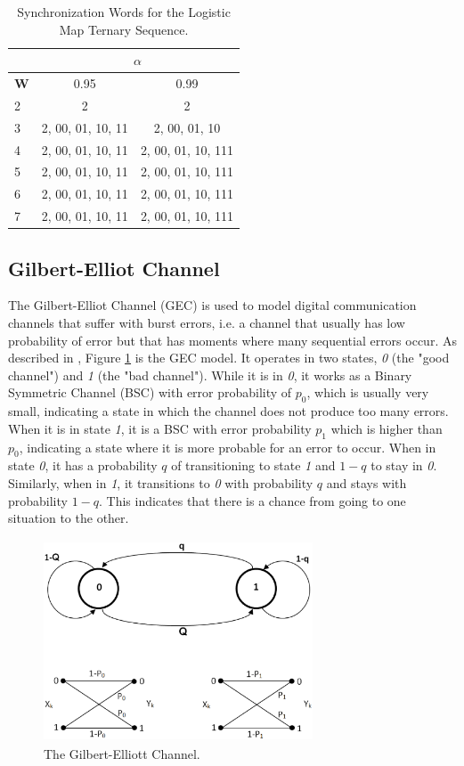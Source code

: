 {\begin{table}
\centering
\begin{tabular}{|l|c|c|}
\hline
 & \multicolumn{2}{c|}{\textbf{$\alpha$}}\\
 \hline
\textbf{W} & 0.95 & 0.99 \\
\hline
2 & 2 & 2 \\ 
3 & 2, 00, 01, 10, 11 & 2, 00, 01, 10 \\ 
4 & 2, 00, 01, 10, 11 & 2, 00, 01, 10, 111 \\ 
5 & 2, 00, 01, 10, 11 & 2, 00, 01, 10, 111 \\
6 & 2, 00, 01, 10, 11 & 2, 00, 01, 10, 111 \\ 
7 & 2, 00, 01, 10, 11 & 2, 00, 01, 10, 111 \\ 
 \hline
\end{tabular}
\caption{Synchronization Words for the Logistic Map Ternary Sequence. \label{tab:lmapsynch}}
\end{table}

\subsection{Gilbert-Elliot Channel}

The Gilbert-Elliot Channel (GEC) is used to model digital communication channels that suffer with burst errors, i.e. a channel that usually has low probability of error but that has moments where many sequential errors occur. As described in \cite{mushkin.89}, Figure \ref{fig:gec} is the GEC model. It operates in two states, \textit{0} (the "good channel") and \textit{1} (the "bad channel"). While it is in \textit{0}, it works as a Binary Symmetric Channel (BSC) with error probability of $p_0$, which is usually very small, indicating a state in which the channel does not produce too many errors. When it is in state \textit{1}, it is a BSC with error probability $p_1$ which is higher than $p_0$, indicating a state where it is more probable for an error to occur. When in state \textit{0}, it has a probability $q$ of transitioning to state \textit{1} and $1-q$ to stay in \textit{0}. Similarly, when in \textit{1}, it transitions to \textit{0} with probability $q$ and stays with probability $1-q$. This indicates that there is a chance from going to one situation to the other.

\begin{figure}
\centering
\includegraphics[width=8cm, height=6cm]{Figuras/figgec.eps}
\caption{\label{fig:gec} The Gilbert-Elliott Channel.}
\end{figure}

}
